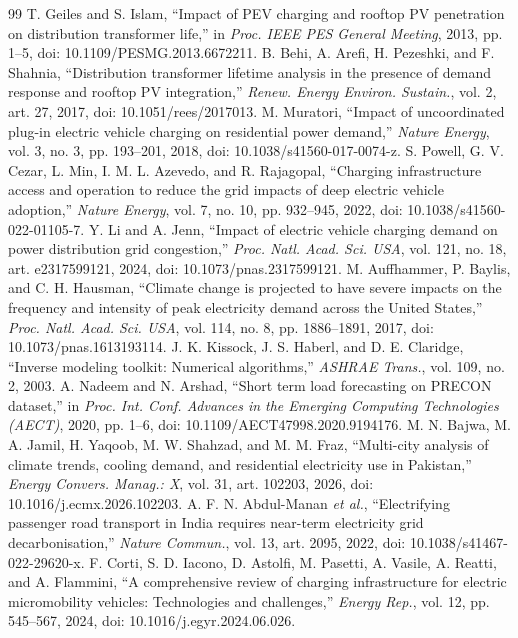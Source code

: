 \documentclass[conference]{IEEEtran}
\begin{document}
\begin{thebibliography}{99}
 T. Geiles and S. Islam, ``Impact of PEV charging and rooftop PV penetration on distribution transformer life,'' in \emph{Proc. IEEE PES General Meeting}, 2013, pp. 1--5, doi: 10.1109/PESMG.2013.6672211.
 B. Behi, A. Arefi, H. Pezeshki, and F. Shahnia, ``Distribution transformer lifetime analysis in the presence of demand response and rooftop PV integration,'' \emph{Renew. Energy Environ. Sustain.}, vol. 2, art. 27, 2017, doi: 10.1051/rees/2017013.
 M. Muratori, ``Impact of uncoordinated plug-in electric vehicle charging on residential power demand,'' \emph{Nature Energy}, vol. 3, no. 3, pp. 193--201, 2018, doi: 10.1038/s41560-017-0074-z.
 S. Powell, G. V. Cezar, L. Min, I. M. L. Azevedo, and R. Rajagopal, ``Charging infrastructure access and operation to reduce the grid impacts of deep electric vehicle adoption,'' \emph{Nature Energy}, vol. 7, no. 10, pp. 932--945, 2022, doi: 10.1038/s41560-022-01105-7.
 Y. Li and A. Jenn, ``Impact of electric vehicle charging demand on power distribution grid congestion,'' \emph{Proc. Natl. Acad. Sci. USA}, vol. 121, no. 18, art. e2317599121, 2024, doi: 10.1073/pnas.2317599121.
 M. Auffhammer, P. Baylis, and C. H. Hausman, ``Climate change is projected to have severe impacts on the frequency and intensity of peak electricity demand across the United States,'' \emph{Proc. Natl. Acad. Sci. USA}, vol. 114, no. 8, pp. 1886--1891, 2017, doi: 10.1073/pnas.1613193114.
 J. K. Kissock, J. S. Haberl, and D. E. Claridge, ``Inverse modeling toolkit: Numerical algorithms,'' \emph{ASHRAE Trans.}, vol. 109, no. 2, 2003.
 A. Nadeem and N. Arshad, ``Short term load forecasting on PRECON dataset,'' in \emph{Proc. Int. Conf. Advances in the Emerging Computing Technologies (AECT)}, 2020, pp. 1--6, doi: 10.1109/AECT47998.2020.9194176.
 M. N. Bajwa, M. A. Jamil, H. Yaqoob, M. W. Shahzad, and M. M. Fraz, ``Multi-city analysis of climate trends, cooling demand, and residential electricity use in Pakistan,'' \emph{Energy Convers. Manag.: X}, vol. 31, art. 102203, 2026, doi: 10.1016/j.ecmx.2026.102203.
 A. F. N. Abdul-Manan \emph{et al.}, ``Electrifying passenger road transport in India requires near-term electricity grid decarbonisation,'' \emph{Nature Commun.}, vol. 13, art. 2095, 2022, doi: 10.1038/s41467-022-29620-x.
 F. Corti, S. D. Iacono, D. Astolfi, M. Pasetti, A. Vasile, A. Reatti, and A. Flammini, ``A comprehensive review of charging infrastructure for electric micromobility vehicles: Technologies and challenges,'' \emph{Energy Rep.}, vol. 12, pp. 545--567, 2024, doi: 10.1016/j.egyr.2024.06.026.

\end{thebibliography}
\end{document}
